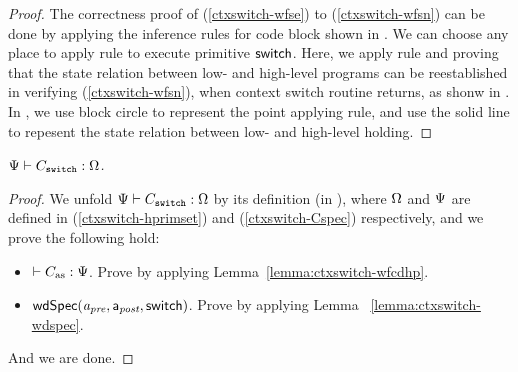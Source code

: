 \begin{proof}
    The correctness proof of
    (\ref{ctxswitch-wfse}) to (\ref{ctxswitch-wfsn}) 
    can be done by applying the inference rules for 
    code block shown in 
    \Fig{\ref{fig:Selected Inference Rules for Refinement Verification}}. 
    We can choose any place to apply 
     rule to execute primitive $\mathsf{switch}$. 
    Here, we apply  rule 
    and proving that the state 
    relation between low- and high-level programs 
    can be reestablished in verifying 
    (\ref{ctxswitch-wfsn}), when context switch routine 
    returns, as shonw in \Fig{\ref{fig:refinement reasoning}}.
    In \Fig{\ref{fig:refinement reasoning}}, we use block 
    circle to represent the point applying  rule, 
    and use the solid line to repesent the state relation 
    between low- and high-level holding. 
\end{proof}

\begin{theorem}
    \em
    ${\Psi} \vdash {C_{\texttt{switch}}} : {\Omega}$. 
\end{theorem}
\begin{proof}
    We unfold 
    ${\Psi} \vdash {C_{\texttt{switch}}} : {\Omega}$ 
    by its definition 
    (in \Fig{\ref{fig:Selected Inference Rules for Refinement Verification}}), 
    where $\Omega$ and $\Psi{}$ are defined in 
    (\ref{ctxswitch-hprimset}) and (\ref{ctxswitch-Cspec}) 
    respectively, and we prove the following hold:
    \begin{itemize}
        \item $\vdash {C_{\text{as}}} : {\Psi{}}$. 
            Prove by applying Lemma~\ref{lemma:ctxswitch-wfcdhp}.
        \item $\textsf{wdSpec}({\textit{a}_\textit{pre}}, {\mathsf{a}_{\textit{post}}}, {\mathsf{switch}})$.
            Prove by applying Lemma ~\ref{lemma:ctxswitch-wdspec}.
    \end{itemize}
    And we are done.
\end{proof}

